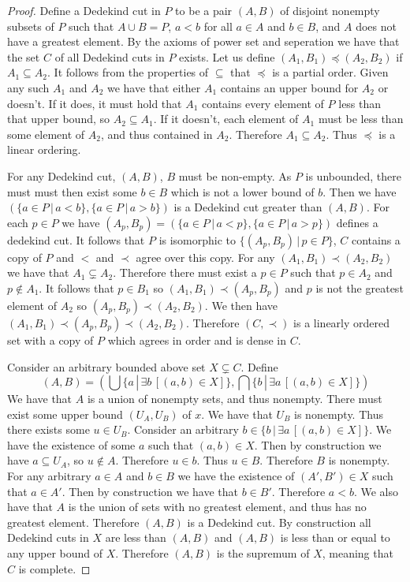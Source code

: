 \documentclass{article}
\theoremstyle{definition}
\begin{document}
\begin{proof}
    Define a Dedekind cut in $P$ to be a pair $(A, B)$ of disjoint nonempty subsets of $P$ such that $A \cup B = P$, $a < b$ for all $a \in A$ and $b \in B$, and $A$ does not have a greatest element. By the axioms of power set and seperation we have that the set $C$ of all Dedekind cuts in $P$ exists. Let us define $(A_1, B_1) \preceq (A_2, B_2)$ if $A_1 \subseteq A_2$. It follows from the properties of $\subseteq$ that $\preceq$ is a partial order. Given any such $A_1$ and $A_2$ we have that either $A_1$ contains an upper bound for $A_2$ or doesn't. If it does, it must hold that $A_1$ contains every element of $P$ less than  that upper bound, so $A_2 \subseteq A_1$. If it doesn't, each element of $A_1$ must be less than some element of $A_2$, and thus contained in $A_2$. Therefore $A_1 \subseteq A_2$. Thus $\preceq$ is a linear ordering. 
    
    For any Dedekind cut, $(A, B)$, $B$ must be non-empty. As $P$ is unbounded, there must must then exist some $b \in B$ which is not a lower bound of $b$. Then we have $(\{a \in P \, | \, a < b\}, \{a \in P \, | \, a > b\})$ is a Dedekind cut greater than $(A, B)$. For each $p \in P$ we have $(A_p, B_p) = (\{a \in P \, | \, a < p\}, \{a \in P \, | \, a > p\})$ defines a dedekind cut. It follows that $P$ is isomorphic to $\{(A_p, B_p) \, | \, p \in P \}$, $C$ contains a copy of $P$ and $<$ and $\prec$ agree over this copy. For any $(A_1, B_1) \prec (A_2, B_2)$ we have that $A_1 \subsetneq A_2$. Therefore there must exist a $p \in P$ such that $p \in A_2$ and $p \not\in A_1$. It follows that $p \in B_1$ so $(A_1, B_1) \prec (A_p, B_p)$ and $p$ is not the greatest element of $A_2$ so $(A_p, B_p) \prec (A_2, B_2)$. We then have $(A_1, B_1) \prec (A_p, B_p) \prec (A_2, B_2)$. Therefore $(C, \prec)$ is a linearly ordered set with a copy of $P$ which agrees in order and is dense in $C$. 

    Consider an arbitrary bounded above set $X \subsetneq C$. Define 
    \[
        (A, B) = (\bigcup \{a \, | \, \exists b \, [(a, b) \in X]\}, \bigcap \{b \, | \, \exists a \, [(a, b) \in X]\})
    \]
    We have that $A$ is a union of nonempty sets, and thus nonempty. There must exist some upper bound $(U_A, U_B)$ of $x$. We have that $U_B$ is nonempty. Thus there exists some $u \in U_B$. Consider an arbitrary $b \in \{b \, | \, \exists a \, [(a, b) \in X]\}$. We have the existence of some $a$ such that $(a, b) \in X$. Then by construction we have $a \subseteq U_A$, so $u \not\in A$. Therefore $u \in b$. Thus $u \in B$. Therefore $B$ is nonempty. For any arbitrary $a \in A$ and $b \in B$ we have the existence of $(A', B') \in X$ such that $a \in A'$. Then by construction we have that $b \in B'$. Therefore $a < b$. We also have that $A$ is the union of sets with no greatest element, and thus has no greatest element. Therefore $(A, B)$ is a Dedekind cut. By construction all Dedekind cuts in $X$ are less than $(A, B)$ and $(A, B)$ is less than or equal to any upper bound of $X$. Therefore $(A, B)$ is the supremum of $X$, meaning that $C$ is complete.
\end{proof}
\end{document}
